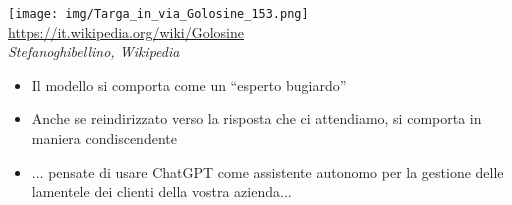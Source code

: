 \begin{frame}[t]
{\begin{minipage}[b]{.6\textwidth}
\begin{figure}
        \end{figure}
    \end{minipage}
    \begin{minipage}[b]{.39\textwidth}
        \begin{minipage}[b]{\textwidth}
            \centering
            \texttt{[image: img/Targa\_in\_via\_Golosine\_153.png]}
            {\tiny\\\url{https://it.wikipedia.org/wiki/Golosine}\\\vspace*{-1pt}\textit{\textcopyright Stefanoghibellino, Wikipedia}}
        \end{minipage}
        \begin{minipage}[b]{\textwidth}
            \vspace*{.3cm}
            \begin{itemize}[leftmargin=10pt,align=right]
                \item[\alert{\faArrowCircleRight}] Il modello si comporta come un ``esperto bugiardo''
                \item[\alert{\faArrowCircleRight}] Anche se reindirizzato verso la risposta che ci attendiamo, si comporta in maniera condiscendente
                \item[\alert{\faArrowCircleRight}] $\ldots$ pensate di usare ChatGPT come assistente autonomo per la gestione delle lamentele dei clienti della vostra azienda$\ldots$
            \end{itemize}
        \end{minipage}
    \end{minipage}
}
\end{frame}
%
